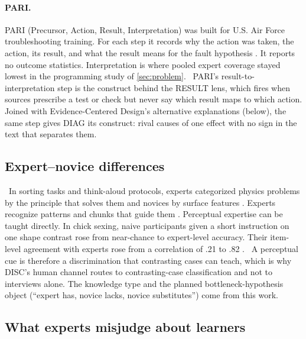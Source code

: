 \paragraph{PARI.} PARI (Precursor, Action, Result, Interpretation) was built
for U.S. Air Force troubleshooting training. For each step it records why the
action was taken, the action, its result, and what the result means for the
fault hypothesis \parencite{hall1995procedural}. It reports no outcome
statistics. Interpretation is where pooled expert coverage stayed lowest in
the programming study of \cref{sec:problem}. \evint\ PARI's
result-to-interpretation step is the construct behind the RESULT lens, which
fires when sources prescribe a test or check but never say which result maps
to which action. Joined with Evidence-Centered Design's alternative
explanations (below), the same step gives DIAG its construct: rival causes of
one effect with no sign in the text that separates them.

\subsection{Expert--novice differences}

\evlit\ In sorting tasks and think-aloud protocols, experts categorized
physics problems by the principle that solves them and novices by surface
features \parencite{chi1981categorization}. Experts recognize patterns and
chunks that guide them \parencite{larkin1980expert,chase1973perception}.
Perceptual expertise can
be taught directly. In chick sexing, naive participants given a short
instruction on one shape contrast rose from near-chance to expert-level
accuracy. Their item-level agreement with experts rose from a correlation of
.21 to .82 \parencite{biederman1987sexing}. \evint\ A
perceptual cue is therefore a discrimination that contrasting cases can
teach, which is why DISC's human channel routes to contrasting-case
classification and not to interviews alone. The knowledge type
 and the planned bottleneck-hypothesis object
(``expert has, novice lacks, novice substitutes'') come from this work.

\subsection{What experts misjudge about learners}
\label{sec:foundations-learners}

